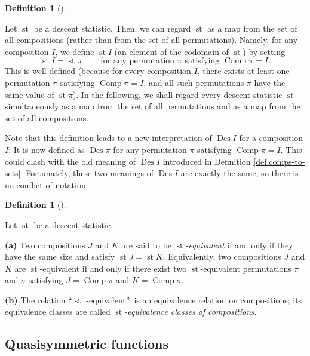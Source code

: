 \documentclass[numbers=enddot,12pt,final,onecolumn,notitlepage]{scrartcl}%
\theoremstyle{definition}
\newtheorem{defi}[theo]{Definition}
\newenvironment{definition}[1][]
{\begin{defi}[#1]\begin{leftbar}}
{\end{leftbar}\end{defi}}
\begin{document}
\begin{definition}
\label{def.des-stat.stI}Let $\operatorname*{st}$ be a descent statistic. Then,
we can regard $\operatorname*{st}$ as a map from the set of all compositions
(rather than from the set of all permutations). Namely, for any composition
$I$, we define $\operatorname*{st}I$ (an element of the codomain of
$\operatorname*{st}$) by setting%
\[
\operatorname*{st}I=\operatorname*{st}\pi\ \ \ \ \ \ \ \ \ \ \text{for any
permutation }\pi\text{ satisfying }\operatorname*{Comp}\pi=I.
\]
This is well-defined (because for every composition $I$, there exists at least
one permutation $\pi$ satisfying $\operatorname*{Comp}\pi=I$, and all such
permutations $\pi$ have the same value of $\operatorname*{st}\pi$). In the
following, we shall regard every descent statistic $\operatorname*{st}$
simultaneously as a map from the set of all permutations and as a map from the
set of all compositions.
\end{definition}

Note that this definition leads to a new interpretation of
$\operatorname*{Des}I$ for a composition $I$: It is now defined as
$\operatorname*{Des}\pi$ for any permutation $\pi$ satisfying
$\operatorname*{Comp}\pi=I$. This could clash with the old meaning of
$\operatorname*{Des}I$ introduced in Definition \ref{def.comps-to-sets}.
Fortunately, these two meanings of $\operatorname*{Des}I$ are exactly the
same, so there is no conflict of notation.

\begin{definition}
\label{def.des-stat.eq-comp}Let $\operatorname*{st}$ be a descent statistic.

\textbf{(a)} Two compositions $J$ and $K$ are said to be $\operatorname*{st}%
$\textit{-equivalent} if and only if they have the same size and satisfy
$\operatorname*{st}J=\operatorname*{st}K$. Equivalently, two compositions $J$
and $K$ are $\operatorname*{st}$-equivalent if and only if there exist two
$\operatorname*{st}$-equivalent permutations $\pi$ and $\sigma$ satisfying
$J=\operatorname*{Comp}\pi$ and $K=\operatorname*{Comp}\sigma$.

\textbf{(b)} The relation \textquotedblleft$\operatorname*{st}$%
-equivalent\textquotedblright\ is an equivalence relation on compositions; its
equivalence classes are called $\operatorname*{st}$\textit{-equivalence
classes of compositions}.
\end{definition}

\subsection{Quasisymmetric functions}
\end{document}
